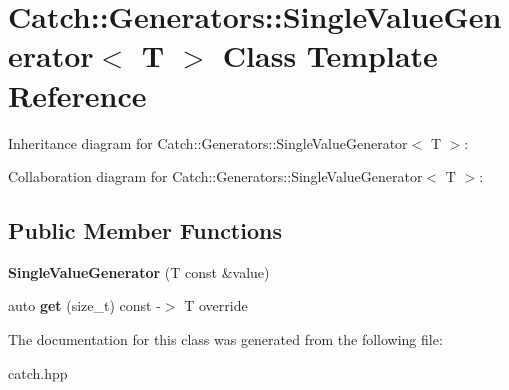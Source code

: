 \hypertarget{classCatch_1_1Generators_1_1SingleValueGenerator}{}\section{Catch\+:\+:Generators\+:\+:Single\+Value\+Generator$<$ T $>$ Class Template Reference}
\label{classCatch_1_1Generators_1_1SingleValueGenerator}


Inheritance diagram for Catch\+:\+:Generators\+:\+:Single\+Value\+Generator$<$ T $>$\+:


Collaboration diagram for Catch\+:\+:Generators\+:\+:Single\+Value\+Generator$<$ T $>$\+:
\subsection*{Public Member Functions}
\begin{DoxyCompactItemize}
\item 
\mbox{\label{classCatch_1_1Generators_1_1SingleValueGenerator_a4bed2ad14ffe04102d8135e2c82b3ace}} 
{\bfseries Single\+Value\+Generator} (T const \&value)
\item 
\mbox{\label{classCatch_1_1Generators_1_1SingleValueGenerator_ad03af3fe263136425595bfd2eec84209}} 
auto {\bfseries get} (size\+\_\+t) const -\/$>$ T override
\end{DoxyCompactItemize}


The documentation for this class was generated from the following file\+:\begin{DoxyCompactItemize}
\item 
catch.\+hpp\end{DoxyCompactItemize}
